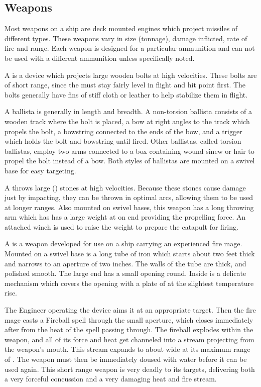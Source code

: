 \begin{multicols*}{2}
\subsection{Weapons}
Most weapons on a ship are deck mounted engines which project missiles of different types. These weapons vary in size (tonnage), damage inflicted, rate of fire and range. Each weapon is designed for a particular ammunition and can not be used with a different ammunition unless specifically noted.

A  is a device which projects large wooden bolts at high velocities. These bolts are of short range, since the must stay fairly level in flight and hit point first. The bolts generally have fins of stiff cloth or leather to help stabilize them in flight.

A ballista is generally  in length and breadth. A non-torsion ballista consists of a wooden track where the bolt is placed, a bow at right angles to the track which propels the bolt, a bowstring connected to the ends of the bow, and a trigger which holds the bolt and bowstring until fired. Other ballistas, called torsion ballistas, employ two arms connected to a box containing wound sinew or hair to propel the bolt instead of a bow. Both styles of ballistas are mounted on a swivel base for easy targeting.

A  throws large () stones at high velocities. Because these stones cause damage just by impacting, they can be thrown in optimal arcs, allowing them to be used at longer ranges. Also mounted on swivel bases,
this weapon has a long throwing arm which has has a large weight at on end providing the propelling force. An attached winch is used to raise the weight to prepare the catapult for firing.

A  is a weapon developed for use on a ship carrying an experienced fire mage. Mounted on a swivel base is a  long tube of iron which starts about two feet thick and narrows to an aperture of two inches. The walls of the tube are  thick, and polished smooth. The large end has a small opening  round. Inside is a delicate mechanism which covers the opening with a plate of  at the slightest temperature rise.

The Engineer operating the device aims it at an appropriate target. Then the fire mage casts a Fireball spell through the small aperture, which closes immediately after from the heat of the spell passing through. The fireball explodes within the weapon, and all of its force and heat get channeled into a  stream projecting from the weapon’s mouth. This stream expands to about  wide at its maximum range of . The weapon must then be immediately doused with water before it can be used again. This short range weapon is very deadly to its targets, delivering both a very forceful concussion and a very damaging heat and fire stream. 


\end{multicols*}
